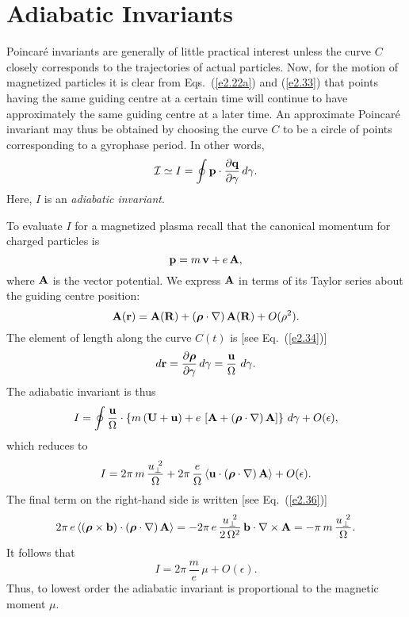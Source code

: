 \section{Adiabatic Invariants}
Poincar\'{e} invariants are generally of little practical interest
unless the curve $C$ closely corresponds to the trajectories of 
actual particles. Now, for the motion of magnetized particles
it is clear from Eqs.~(\ref{e2.22a}) and (\ref{e2.33}) that points having the same
guiding centre at a certain time will continue to have approximately
the same guiding centre at a later time. An approximate Poincar\'{e}
invariant may thus be obtained by choosing the curve $C$ to be a circle of points
corresponding to a gyrophase period. In other words,
\begin{equation}
{\cal I} \simeq I = \oint {\bf p}\cdot \frac{\partial{\bf q}}{\partial\gamma}\,
d\gamma.
\end{equation}
Here, $I$ is an {\em adiabatic invariant}.

To evaluate $I$ for a magnetized plasma recall that the canonical momentum
for charged particles is
\begin{equation}
{\bf p} = m\,{\bf v} +e\,{\bf A},
\end{equation}
where ${\bf A}$ is the vector potential. We express ${\bf A}$ in terms
of its Taylor series about the guiding centre position:
\begin{equation}
{\bf A}({\bf r}) = {\bf A}({\bf R}) + (\mbox{\boldmath$\rho$}\cdot\nabla)\,{\bf A}({\bf R})
+ O(\rho^2).
\end{equation}
The element of length along the curve $C(t)$ is [see Eq.~(\ref{e2.34})]
\begin{equation}
d{\bf r} = \frac{\partial\mbox{\boldmath$\rho$}}{\partial \gamma}\,d\gamma = 
\frac{{\bf u}}{{\Omega}}\,\,d\gamma.
\end{equation}
The adiabatic invariant is thus
\begin{equation}
I = \oint \frac{{\bf u}}{{\Omega}} \cdot \left\{
m\,({\bf U} + {\bf u}) + e\,\left[{\bf A} + (\mbox{\boldmath$\rho$}\cdot
\nabla)\,{\bf A}\right]\right\}\,d\gamma + O(\epsilon),
\end{equation}
which reduces to
\begin{equation}
I = 2\pi\,m\,\frac{u_\perp^{~2}}{{\Omega}} + 2\pi\,\frac{e}{{\Omega}}\,
\langle {\bf u}\cdot(\mbox{\boldmath$\rho$}\cdot
\nabla)\,{\bf A}\rangle + O(\epsilon).
\end{equation}
The final term on the right-hand side is written [see Eq.~(\ref{e2.36})]
\begin{equation}
2\pi\,e\,\langle (\mbox{\boldmath$\rho$}\times{\bf b}) \cdot(\mbox{\boldmath$\rho$}\cdot
\nabla)\,{\bf A}\rangle = -2\pi\,e\,\frac{u_\perp^{~2}}{2\,{\Omega}^2}\,
{\bf b}\cdot \nabla\times{\bf A} = -\pi\,m\,\frac{u_\perp^{~2}}{{\Omega}}.
\end{equation}
It follows that
\begin{equation}
I = 2\pi\, \frac{m}{e}\,\mu + O(\epsilon).
\end{equation}
Thus, to lowest order the adiabatic invariant is proportional to the magnetic moment $\mu$. 

